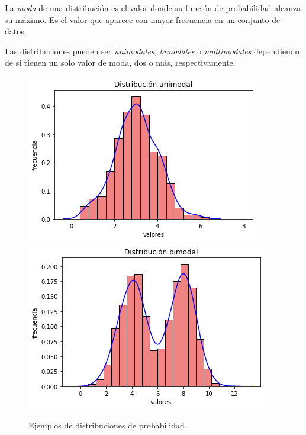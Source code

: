 \documentclass[oneside,openright,titlepage,numbers=noenddot,openany,headinclude,footinclude=true,
cleardoublepage=empty,abstractoff,BCOR=5mm,paper=a4,fontsize=12pt,main=spanish]{scrreprt}
\begin{document}
\begin{definition}[Moda]
La \textit{moda} de una distribución es el valor donde su función de probabilidad alcanza su máximo. Es el valor que aparece con mayor frecuencia en un conjunto de datos.
\end{definition}

\clearpage

Las distribuciones pueden ser \textit{unimodales, bimodales} o \textit{multimodales} dependiendo de si tienen un solo valor de moda, dos o más, respectivamente.\\

\begin{figure}[h]
      \includegraphics[width=\linewidth]{images/unimodal.png}
    \endminipage\hfill
      \includegraphics[width=\linewidth]{images/bimodal.png}
    \endminipage
     \caption{Ejemplos de distribuciones de probabilidad.}
\end{figure}
\end{document}
